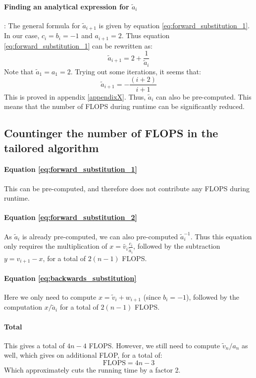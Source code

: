 \documentclass[a4paper, 10pt]{article}
\begin{document}
\paragraph*{Finding an analytical expression for $\tilde{a}_i$}: The general formula for $\tilde{a}_{i+1}$ is given by equation \ref{eq:forward_substitution_1}. In our case, $c_i=b_i=-1$ and $a_{i+1}=2$. Thus equation \ref{eq:forward_substitution_1} can be rewritten as:
\begin{equation}\label{eq:forward_substitution_tailored}
\tilde{a}_{i+1}=2+\frac{1}{\tilde{a}_i}
\end{equation}
Note that $\tilde{a}_1=a_1=2$. Trying out some iterations, it seems that:
\begin{equation}
\tilde{a}_{i+1}=-\frac{(i+2)}{i+1}
\end{equation}
This is proved in appendix \ref{appendixX}. Thus, $\tilde{a}_i$ can also be pre-computed. This means that the number of FLOPS during runtime can be significantly reduced.
\subsection{Countinger the number of FLOPS in the tailored algorithm}
\paragraph{Equation \ref{eq:forward_substitution_1}} This can be pre-computed, and therefore does not contribute any FLOPS during runtime. 
\paragraph*{Equation \ref{eq:forward_substitution_2}} As $\tilde{a}_i$ is already pre-computed, we can also pre-computed $\tilde{a}_i^{-1}$. Thus this equation only requires the multiplication of $x=\tilde{v_i}\frac{c_i}{\tilde{a}_i}$, followed by the subtraction $y=v_{i+1}-x$, for a total of $2(n-1)$ FLOPS. 
\paragraph*{Equation \ref{eq:backwards_substitution}} Here we only need to compute $x=\tilde{v}_i+w_{i+1}$ (since $b_i=-1$), followed by the computation $x/\tilde{a}_i$ for a total of $2(n-1)$ FLOPS. 
\paragraph*{Total}
This gives a total of $4n-4$ FLOPS. However, we still need to compute $\tilde{v}_n/a_n$ as well, which gives on additional FLOP, for a total of:
$$\mathrm{FLOPS}=4n-3$$
Which approximately cuts the running time by a factor 2. 
\end{document}
